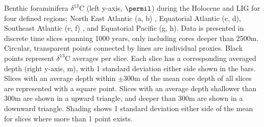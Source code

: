 Benthic foraminifera $\delta^{13}$C (left y-axis, $\permil$) during the Holocene and LIG for four defined regions; North East Atlantic (a, b) , Equatorial Atlantic (c, d), Southeast Atlantic (e, f) , and Equatorial Pacific (g, h). Data is presented in discrete time slices spanning 1000 years, only including cores deeper than 2500m. Circular, transparent points connected by lines are individual proxies. Black points represent $\delta^{13}$C averages per slice. Each slice has a corresponding averaged depth (right y-axis, m), with 1 standard deviation either side shown in the bars. Slices with an average depth within $\pm$300m of the mean core depth of all slices are represented with a square point. Slices with an average depth shallower than 300m are shown in a upward triangle, and deeper than 300m are shown in a downward triangle. Shading shows 1 standard deviation either side of the mean for slices where more than 1 point exists.